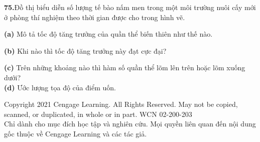 \begin{minipage}[t]{0.485\textwidth}
\vspace{0.5em}
\noindent\textbf{75.}\hspace{0.5em}Đồ thị biểu diễn số lượng tế bào nấm men trong một môi trường nuôi cấy mới ở phòng thí nghiệm theo thời gian được cho trong hình vẽ.

\vspace{0.3em}
\begin{center}
\end{center}

\vspace{-0.2em}
\noindent
\begin{minipage}[t]{0.53\linewidth}
  \textbf{(a)} Mô tả tốc độ tăng trưởng của quần thể biến thiên như thế nào.
\end{minipage}\hfill
\begin{minipage}[t]{0.45\linewidth}
  \textbf{(b)} Khi nào thì tốc độ tăng trưởng này đạt cực đại?
\end{minipage}

\vspace{0.2em}
\noindent\textbf{(c)} Trên những khoảng nào thì hàm số quần thể lõm lên trên hoặc lõm xuống dưới?\\
\textbf{(d)} Ước lượng tọa độ của điểm uốn.

\end{minipage}

\vfill
\noindent
\parbox{\textwidth}{%
  \tiny\color{gray!80}%
  \centering
  Copyright 2021 Cengage Learning. All Rights Reserved. May not be copied, scanned, or duplicated, in whole or in part. WCN 02-200-203\\
  Chỉ dành cho mục đích học tập và nghiên cứu. Mọi quyền liên quan đến nội dung gốc thuộc về Cengage Learning và các tác giả.
}

